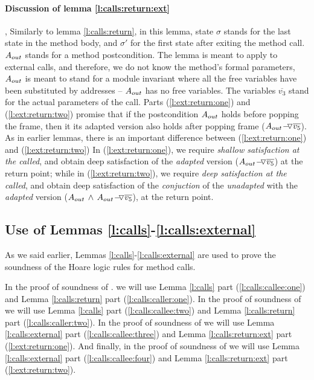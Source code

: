 \paragraph{Discussion of lemma  \ref{l:calls:return:ext}}, Similarly to  lemma \ref{l:calls:return},  
in this lemma, state  $\sigma$ stands for the last state in the method body, and $\sigma'$ for the first state after exiting  the method call.
$A_{out}$ stands for a method postcondition.
The lemma is meant to apply to external calls, and therefore, we do not know the method's formal parameters, 
$A_{out}$ is meant to stand for a module invariant where all the free variables have been substituted by addresses --
\ie $A_{out}$ has no free variables.
The variables $\overline {v_3}$ stand for the actual parameters of the call.
Parts    (\ref{l:ext:return:one})  and  (\ref{l:ext:return:two})
promise that if the postcondition $A_{out}$ holds before popping the frame, then it its adapted version 
also holds after popping frame (${ A_{out} \!-\!\!\!\,\!{\triangledown} \overline {v_5}}$).
 As in earlier lemmas, there is an important difference between   (\ref{l:ext:return:one})  and  (\ref{l:ext:return:two})
In  (\ref{l:ext:return:one}),  we require \emph{shallow satisfaction at the called}, 
and obtain   deep satisfaction of the \emph{adapted} version (${ A_{out} \!-\!\!\!\,\!{\triangledown} \overline {v_5}}$) at the return point;
while in (\ref{l:ext:return:two}), we  require \emph{deep satisfaction at the called}, 
and obtain deep satisfaction of the   \emph{conjuction}  of the \emph{unadapted} with the \emph{adapted} version (${A_{out} \, \wedge\, { A_{out} \!-\!\!\!\,\!{\triangledown} \overline {v_5}}}$),
at the return point.

\subsection{\textbf{Use of Lemmas \ref{l:calls}-\ref{l:calls:external} }}

As we said earlier, Lemmas \ref{l:calls}-\ref{l:calls:external} are used to prove the soundness of the Hoare logic rules for method calls.

In the proof of soundness of {}. we will use Lemma \ref{l:calls} part (\ref{l:calls:callee:one}) and Lemma \ref{l:calls:return} part (\ref{l:calls:caller:one}).  
In the proof of soundness of {} we will use  Lemma \ref{l:calls} part (\ref{l:calls:callee:two}) and Lemma \ref{l:calls:return} part (\ref{l:calls:caller:two}).
In the proof of soundness of {} we will use  Lemma \ref{l:calls:external} part (\ref{l:calls:callee:three}) and Lemma \ref{l:calls:return:ext} part (\ref{l:ext:return:one}).
And finally, in the proof of soundness of {} we will use  Lemma \ref{l:calls:external} part (\ref{l:calls:callee:four}) and Lemma \ref{l:calls:return:ext} part (\ref{l:ext:return:two}).



 



 
 
  